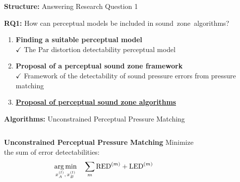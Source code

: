 \documentclass[aspectratio=169]{beamer}
\begin{document}
\begin{frame}{\textbf{Structure:} Answering Research Question 1}
    \begin{block}{\textbf{RQ1:} How can perceptual models be included in sound~zone~algorithms?}
        \begin{enumerate}
            \item \textbf{Finding a suitable perceptual model}
                \\{{$\mathbf{\checkmark}$} The Par distortion detectability perceptual model}\vspace{3pt}
            \item \textbf{Proposal of a perceptual sound zone framework}
                \\{{$\mathbf{\checkmark}$} Framework of the detectability of sound pressure errors from pressure matching}\vspace{3pt}
            \item \underline{\textbf{Proposal of perceptual sound zone algorithms}}
                \\\vspace{3pt}
        \end{enumerate}
    \end{block}
\end{frame}

\begin{frame}{\textbf{Algorithms:} Unconstrained Perceptual Pressure Matching}
    \begin{columns}[c]
        \centering
        \begin{block}{\textbf{Unconstrained Perceptual Pressure Matching}}
            Minimize the sum of error detectabilities:
            \begin{equation}
                \operatorname*{arg\,min}_{x_A^{(l)},\,x_B^{(l)}}\quad \sum_m \text{RED}^{(m)} + \text{LED}^{(m)}
            \end{equation}
        \end{block}
        \begin{figure}[]
            \centering
            \vspace{-13pt}
            \scalebox{0.6}{}
        \end{figure}
    \end{columns}
\end{frame}
\end{document}
